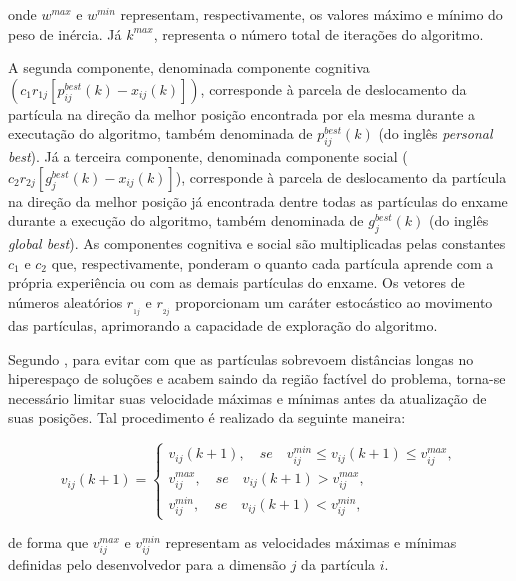 \documentclass[
	12pt,				%
	openany,			%
	twoside,			%
	a4paper,			%
	chapter=TITLE,		%
	section=Title,		%
	subsection=Title,	%
	subsubsection=Title,%
	english,			%
	french,				%
	spanish,			%
	brazil			%
	]{abntex2}
\begin{document}
\begin{ERRATA}
\noindent onde $w^{max}$ e $w^{min}$ representam, respectivamente, os valores máximo e mínimo do peso de inércia. Já $k^{max}$, representa o número total de iterações do algoritmo.

A segunda componente, denominada componente cognitiva $(c_1r_{1j}[p^{best}_{ij}(k)-x_{ij}(k)])$, corresponde à parcela de deslocamento da partícula na direção da melhor posição encontrada por ela mesma durante a executação do algoritmo, também denominada de $p^{best}_{ij}(k)$ (do inglês \emph{personal best}). Já a terceira componente, denominada componente social ($c_2r_{2j}[g^{best}_{j}(k)-x_{ij}(k)]$), corresponde à parcela de deslocamento da partícula na direção da melhor posição já encontrada dentre todas as partículas do enxame durante a execução do algoritmo, também denominada de $g^{best}_{j}(k)$ (do inglês \emph{global best}). As componentes cognitiva e social são multiplicadas pelas constantes $c_1$ e $c_2$ que, respectivamente, ponderam o quanto cada partícula aprende com a própria experiência ou com as demais partículas do enxame. Os vetores de números aleatórios $r__{1j}$ e $r__{2j}$ proporcionam um caráter estocástico ao movimento das partículas, aprimorando a capacidade de exploração do algoritmo. 

Segundo , para evitar com que as partículas sobrevoem distâncias longas no hiperespaço de soluções e acabem saindo da região factível do problema, torna-se necessário limitar suas velocidade máximas e mínimas antes da atualização de suas posições. Tal procedimento é realizado da seguinte maneira:


\begin{equation}\label{clampvel}
v_{ij}(k+1) = \begin{cases}
v_{ij}(k+1), \quad se \quad v^{min}_{ij} \leq  v_{ij}(k+1) \leq v^{max}_{ij},\\
v^{max}_{ij}, \quad se \quad v_{ij}(k+1) > v^{max}_{ij},\\
v^{min}_{ij}, \quad se \quad v_{ij}(k+1) < v^{min}_{ij},

\end{cases}
\end{equation}

\noindent de forma que $v^{max}_{ij}$ e $v^{min}_{ij}$ representam as velocidades máximas e mínimas definidas pelo desenvolvedor para a dimensão $j$ da partícula $i$. 


\end{ERRATA}
\end{document}
